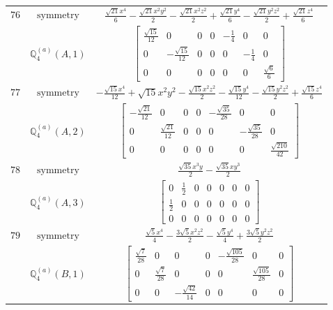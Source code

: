 \documentclass[fleqn,8pt,landscape]{jsarticle}
\begin{document}
\begin{longtable}{ccc}
$ 76 $ & $ \text{symmetry} $ & $ \frac{\sqrt{21} x^{4}}{6} - \frac{\sqrt{21} x^{2} y^{2}}{2} - \frac{\sqrt{21} x^{2} z^{2}}{2} + \frac{\sqrt{21} y^{4}}{6} - \frac{\sqrt{21} y^{2} z^{2}}{2} + \frac{\sqrt{21} z^{4}}{6} $ \\
$  $ & $ \mathbb{Q}_{4}^{(a)}(A,1) $ & $ \begin{bmatrix} \frac{\sqrt{15}}{12} & 0 & 0 & 0 & - \frac{1}{4} & 0 & 0 \\ 0 & - \frac{\sqrt{15}}{12} & 0 & 0 & 0 & - \frac{1}{4} & 0 \\ 0 & 0 & 0 & 0 & 0 & 0 & \frac{\sqrt{6}}{6} \end{bmatrix} $ \\ \hline
$ 77 $ & $ \text{symmetry} $ & $ - \frac{\sqrt{15} x^{4}}{12} + \sqrt{15} x^{2} y^{2} - \frac{\sqrt{15} x^{2} z^{2}}{2} - \frac{\sqrt{15} y^{4}}{12} - \frac{\sqrt{15} y^{2} z^{2}}{2} + \frac{\sqrt{15} z^{4}}{6} $ \\
$  $ & $ \mathbb{Q}_{4}^{(a)}(A,2) $ & $ \begin{bmatrix} - \frac{\sqrt{21}}{12} & 0 & 0 & 0 & - \frac{\sqrt{35}}{28} & 0 & 0 \\ 0 & \frac{\sqrt{21}}{12} & 0 & 0 & 0 & - \frac{\sqrt{35}}{28} & 0 \\ 0 & 0 & 0 & 0 & 0 & 0 & \frac{\sqrt{210}}{42} \end{bmatrix} $ \\ \hline
$ 78 $ & $ \text{symmetry} $ & $ \frac{\sqrt{35} x^{3} y}{2} - \frac{\sqrt{35} x y^{3}}{2} $ \\
$  $ & $ \mathbb{Q}_{4}^{(a)}(A,3) $ & $ \begin{bmatrix} 0 & \frac{1}{2} & 0 & 0 & 0 & 0 & 0 \\ \frac{1}{2} & 0 & 0 & 0 & 0 & 0 & 0 \\ 0 & 0 & 0 & 0 & 0 & 0 & 0 \end{bmatrix} $ \\ \hline
$ 79 $ & $ \text{symmetry} $ & $ \frac{\sqrt{5} x^{4}}{4} - \frac{3 \sqrt{5} x^{2} z^{2}}{2} - \frac{\sqrt{5} y^{4}}{4} + \frac{3 \sqrt{5} y^{2} z^{2}}{2} $ \\
$  $ & $ \mathbb{Q}_{4}^{(a)}(B,1) $ & $ \begin{bmatrix} \frac{\sqrt{7}}{28} & 0 & 0 & 0 & - \frac{\sqrt{105}}{28} & 0 & 0 \\ 0 & \frac{\sqrt{7}}{28} & 0 & 0 & 0 & \frac{\sqrt{105}}{28} & 0 \\ 0 & 0 & - \frac{\sqrt{42}}{14} & 0 & 0 & 0 & 0 \end{bmatrix} $ \\ \hline

\end{longtable}
\end{document}
